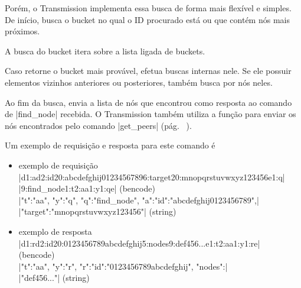 Porém, o Transmission implementa essa busca de forma mais flexível e simples. De início,
busca o \gls*{bucket} no qual o ID procurado está ou que contém nós mais próximos.


A busca do \gls*{bucket} itera sobre a lista ligada de \glspl*{bucket}.


Caso retorne o \gls*{bucket} mais provável, efetua buscas internas nele. Se ele possuir
elementos vizinhos anteriores ou posteriores, também busca por nós neles.


Ao fim da busca, envia a lista de nós que encontrou como resposta ao comando de
\bverb|find_node| recebida. O Transmission também utiliza a função para enviar os nós
encontrados pelo comando \bverb|get_peers| (pág. ~\pageref{subsubsubsec:getpeers}).


Um exemplo de requisição e resposta para este comando é

\begin{itemize}
    \item exemplo de requisição \\
        \bverb|d1:ad2:id20:abcdefghij01234567896:target20:mnopqrstuvwxyz123456e1:q| \\
        \bverb|9:find_node1:t2:aa1:y1:qe| (\gls*{bencode}) \\
        \sverb|{"t":"aa", "y":"q", "q":"find_node", "a":{"id":"abcdefghij0123456789",| \\
        \sverb|"target":"mnopqrstuvwxyz123456"}}| (\gls*{string})

    \item exemplo de resposta \\
        \bverb|d1:rd2:id20:0123456789abcdefghij5:nodes9:def456...e1:t2:aa1:y1:re| \\
        (\gls*{bencode}) \\
        \sverb|{"t":"aa", "y":"r", "r":{"id":"0123456789abcdefghij", "nodes":| \\
        \sverb|"def456..."}}| (\gls*{string})
\end{itemize}

